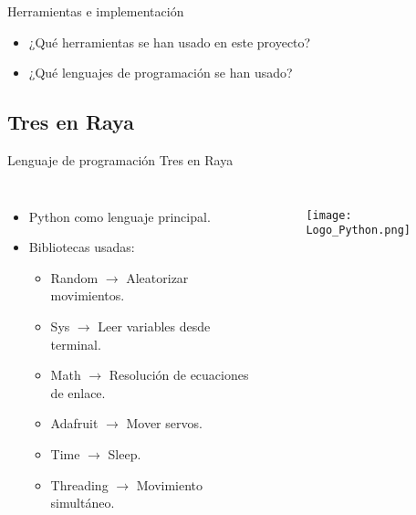 \documentclass[xcolor = {dvipsnames, table}]{beamer}
\begin{document}
\begin{frame}{Herramientas e implementación}
  \begin{itemize}
    \item ¿Qué herramientas se han usado en este proyecto?
    \item ¿Qué lenguajes de programación se han usado?
  \end{itemize}
\end{frame}

\subsection{Tres en Raya}

\begin{frame}{Lenguaje de programación Tres en Raya}
  \begin{columns}
    \begin{itemize}
      \item Python como lenguaje principal.
      \item Bibliotecas usadas:
      \begin{itemize}
        \item Random $\rightarrow$ Aleatorizar movimientos.
        \item Sys $\rightarrow$ Leer variables desde terminal.
        \item Math $\rightarrow$ Resolución de ecuaciones de enlace.
        \item \colorbox{gray!50}{Adafruit} $\rightarrow$ Mover servos.
        \item \colorbox{gray!50}{Time} $\rightarrow$ Sleep.
        \item \colorbox{gray!50}{Threading} $\rightarrow$ Movimiento simultáneo.
      \end{itemize}
    \end{itemize}
    \begin{figure}
      \centering
      \texttt{[image: Logo\_Python.png]}
    \end{figure}
  \end{columns}

\end{frame}
\end{document}
